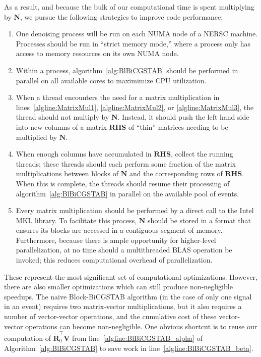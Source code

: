 As a result, and because the bulk of our computational time is spent multiplying by $\mathbf{N}$, we pursue the following strategies to improve code performance:
\begin{enumerate}
\item One denoising process will be run on each NUMA node of a NERSC machine.  Processes should be run in ``strict memory mode,'' where a process only has access to memory resources on its own NUMA node.
\item Within a process, algorithm~\ref{alg:BlBiCGSTAB} should be performed in parallel on all available cores to maximimize CPU utilization.
\item When a thread encounters the need for a matrix multiplication in lines~\ref{algline:MatrixMul1}, \ref{algline:MatrixMul2}, or \ref{algline:MatrixMul3}, the thread should not multiply by $\mathbf{N}$.  Instead, it should push the left hand side into new columns of a matrix $\mathbf{RHS}$ of ``thin'' matrices needing to be multiplied by $\mathbf{N}$.
\item When enough columns have accumulated in $\mathbf{RHS}$, collect the running threads; these threads should each perform some fraction of the matrix multiplications between blocks of $\mathbf{N}$ and the corresponding rows of $\mathbf{RHS}$.  When this is complete, the threads should resume their processing of algorithm~\ref{alg:BlBiCGSTAB} in parallel on the available pool of events.
\item Every matrix multiplication should be performed by a direct call to the Intel MKL library.  To facilitate this process, $\mathbf{N}$ should be stored in a format that ensures its blocks are accessed in a contiguous segment of memory.  Furthermore, because there is ample opportunity for higher-level parallelization, at no time should a multithreaded BLAS operation be invoked; this reduces computational overhead of parallelization.
\end{enumerate}

These represent the most significant set of computational optimizations.  However, there are also smaller optimizations which can still produce non-negligible speedups.  The naive Block-BiCGSTAB algorithm (in the case of only one signal in an event) requires two matrix-vector multiplications, but it also requires a number of vector-vector operations, and the cumulative cost of these vector-vector operations can become non-negligible.  One obvious shortcut is to reuse our computation of $\mathbf{\widetilde{R}}_0^\top \mathbf{V}$ from line~\ref{algline:BlBiCGSTAB_alpha} of Algorithm~\ref{alg:BlBiCGSTAB} to save work in line~\ref{algline:BlBiCGSTAB_beta}.

